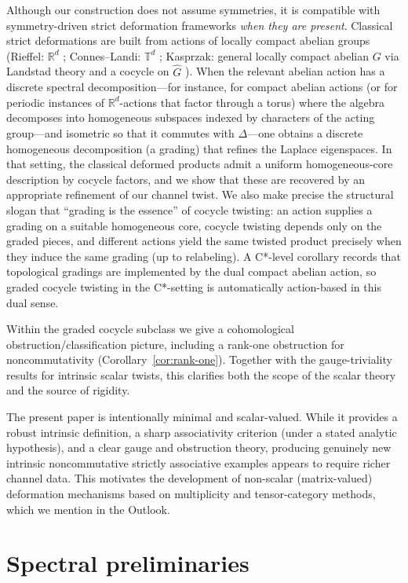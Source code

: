 \documentclass[11pt]{amsart}
\theoremstyle{plain}
\theoremstyle{definition}
\theoremstyle{remark}
\newcommand{\bbR}{\mathbb{R}}
\newcommand{\bbT}{\mathbb{T}}
\begin{document}
Although our construction does not assume symmetries, it is compatible with symmetry-driven strict deformation frameworks \emph{when they are present}.  Classical strict deformations are built from actions of locally compact abelian groups (Rieffel: $\bbR^d$ \cite{Rieffel}; Connes--Landi: $\bbT^d$ \cite{ConnesLandi}; Kasprzak: general locally compact abelian $G$ via Landstad theory and a cocycle on $\widehat G$ \cite{Kasprzak}).  When the relevant abelian action has a discrete spectral decomposition---for instance, for compact abelian actions (or for periodic instances of $\bbR^d$-actions that factor through a torus) where the algebra decomposes into homogeneous subspaces indexed by characters of the acting group---and isometric so that it commutes with $\Delta$---one obtains a discrete homogeneous decomposition (a grading) that refines the Laplace eigenspaces. In that setting, the classical deformed products admit a uniform homogeneous-core description by cocycle factors, and we show that these are recovered by an appropriate refinement of our channel twist.  We also make precise the structural slogan that ``grading is the essence'' of cocycle twisting: an action supplies a grading on a suitable homogeneous core, cocycle twisting depends only on the graded pieces, and different actions yield the same twisted product precisely when they induce the same grading (up to relabeling).  A C*-level corollary records that topological gradings are implemented by the dual compact abelian action, so graded cocycle twisting in the C*-setting is automatically action-based in this dual sense.

Within the graded cocycle subclass we give a cohomological obstruction/classification picture, including a rank-one obstruction for noncommutativity (Corollary~\ref{cor:rank-one}).  Together with the gauge-triviality results for intrinsic scalar twists, this clarifies both the scope of the scalar theory and the source of rigidity.

The present paper is intentionally minimal and scalar-valued.  While it provides a robust intrinsic definition, a sharp associativity criterion (under a stated analytic hypothesis), and a clear gauge and obstruction theory, producing genuinely new intrinsic noncommutative strictly associative examples appears to require richer channel data.  This motivates the development of non-scalar (matrix-valued) deformation mechanisms based on multiplicity and tensor-category methods, which we mention in the Outlook.

\section{Spectral preliminaries}
\end{document}
